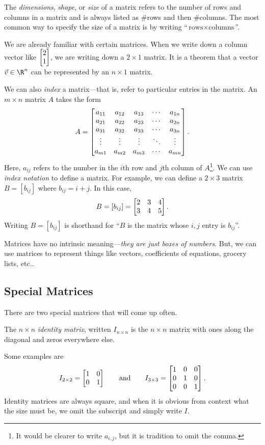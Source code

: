 	The \emph{dimensions}, \emph{shape}, or \emph{size} of a matrix refers
	to the number of rows and columns in a matrix and is always listed
	as $\#$rows and then $\#$columns. The most common way to specify the
	size of a matrix is by writing ``$\text{rows}\times\text{columns}$''.

	We are already familiar with certain matrices. When we write down
	a column vector like $\mat{2\\1}$, we are writing down a $2\times 1$ matrix.
	It is a theorem that a vector $\vec v\in\R^n$ can be represented by an $n\times 1$
	matrix.

	We can also \emph{index} a matrix---that is, refer to particular entries in the matrix.
	An $m\times n$ matrix $A$ takes the form
	\[
		A = \begin{bmatrix}
			a_{11}&a_{12}&a_{13}&\cdots& a_{1n}\\
			a_{21}&a_{22}&a_{23}&\cdots& a_{2n}\\
			a_{31}&a_{32}&a_{33}&\cdots& a_{3n}\\
			\vdots&\vdots&\vdots&\ddots&\vdots\\
			a_{m1}&a_{m2}&a_{m3}&\cdots& a_{mn}\\
		\end{bmatrix}.
	\]
	Here, $a_{ij}$ refers to the number in the $i$th row and $j$th column of $A$\footnote{
	It would be clearer to write $a_{i,j}$, but it is tradition to omit the comma.}. We can
	use \emph{index notation} to define a matrix. For example,
	we can define a $2\times 3$ matrix $B=[b_{ij}]$ where $b_{ij}=i+j$.  In this case,
	\[
		B=[b_{ij}] = \mat{2&3&4\\3&4&5}.
	\]
	Writing $B=[b_{ij}]$ is shorthand for ``$B$ is the matrix whose $i,j$ entry is $b_{ij}$''.

	\bigskip
	Matrices have no intrinsic meaning---\emph{they are just boxes of numbers}.
	But, we can use matrices to represent things like vectors, coefficients of
	equations, grocery lists, etc..

\subsection{Special Matrices}
	There are two special matrices that will come up often.
	\begin{definition}
		The $n\times n$ \emph{identity matrix}, written $I_{n\times n}$ is the $n\times n$
		matrix with ones along the diagonal and zeros everywhere else.
	\end{definition}
	Some examples are
	\[
		I_{2\times 2}=\mat{1&0\\0&1}\qquad\text{and}\qquad I_{3\times 3}=\mat{1&0&0\\0&1&0\\0&0&1}.
	\]
	Identity matrices are always square, and when it is obvious from context what
	the size must be, we omit the subscript and simply write $I$.

